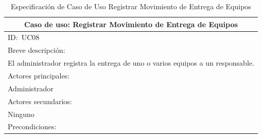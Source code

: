 \documentclass[stu, 12pt, letterpaper, donotrepeattitle, floatsintext, natbib]{apa7}
\begin{document}
\begin{longtable}{@{} p{16.5cm} @{}}
    \caption{Especificaci\'on de Caso de Uso Registrar Movimiento de Entrega de Equipos}\label{tab:UC08}                                                                                                                     \\ \toprule
    \multicolumn{1}{c}{Caso de uso: Registrar Movimiento de Entrega de Equipos}                                                                                                                                              \\ \midrule
    ID:~UC08                                                                                                                                                                                                                 \\ \midrule
    Breve descripci\'on:                                                                                                                                                                                                     \\
    El administrador registra la entrega de uno o varios equipos a un responsable.                                                                                                                                           \\ \midrule
    Actores principales:                                                                                                                                                                                                     \\
    Administrador                                                                                                                                                                                                            \\ \midrule
    Actores secundarios:                                                                                                                                                                                                     \\
    Ninguno                                                                                                                                                                                                                  \\ \midrule
    Precondiciones:                                                                                                                                                                                                          \\

\end{longtable}
\end{document}
